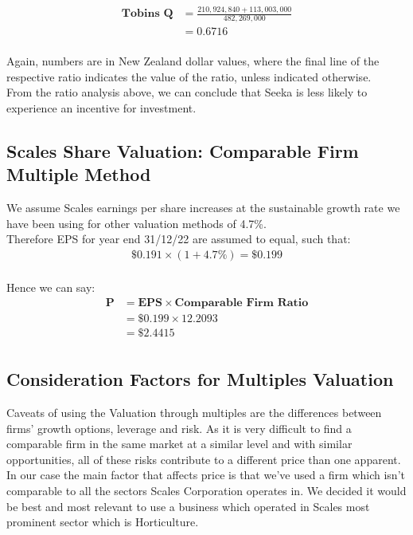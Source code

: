 \documentclass{article}
\begin{document}
\begin{equation*}
\begin{split}
\textbf{Tobins Q}  &= \frac{210,924,840 + 113,003,000}{482,269,000}\\
                   &= 0.6716 \\
\end{split}
\end{equation*}

Again, numbers are in New Zealand dollar values, where the final line of the respective ratio indicates the value of the ratio, unless indicated otherwise.\\
From the ratio analysis above, we can conclude that Seeka is less likely to experience an incentive for investment.  

\subsection{Scales Share Valuation: Comparable Firm Multiple Method} 

We assume Scales earnings per share increases at the sustainable growth rate we have been using for other valuation methods of 4.7\%. \\
Therefore EPS for year end 31/12/22 are assumed to equal, such that: 
\begin{equation*}
\begin{split}
\$0.191 \times (1 + 4.7\%) = \$0.199 \\
\end{split}
\end{equation*}

Hence we can say:
\begin{equation*}
\begin{split}
\textbf{P} &= \textbf{EPS} \times \textbf{Comparable Firm Ratio} \\ 
           &= \$0.199 \times 12.2093 \\
           &= \$2.4415 \\
\end{split}
\end{equation*}

\subsection{Consideration Factors for Multiples Valuation} 

Caveats of using the Valuation through multiples are the differences between firms' growth options, leverage and risk. As it is very difficult to find a comparable firm in the same market at a similar level and with similar opportunities, all of these risks contribute to a different price than one apparent. In our case the main factor that affects price is that we’ve used a firm which isn’t comparable to all the sectors Scales Corporation operates in. We decided it would be best and most relevant to use a business which operated in Scales most prominent sector which is Horticulture. \\
\end{document}

